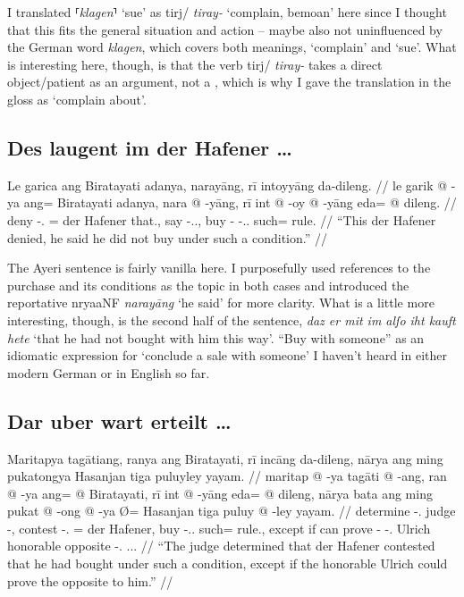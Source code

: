 \documentclass[12pt,paper=a4]{scrartcl}
\newcommand{\fw}[1]{\textit{#1}} %
\newcommand{\norm}[1]{⸢\textit{#1}⸣} %
\newcommand{\ayr}[1]{{\Tagati #1}}
\newcommand{\xayr}[3]{{\Tagati #1} \emph{#2} \enquote*{#3}}
\begin{document}
I translated \norm{klagen} `sue' as \xayr{tirj/}{tiray-}{complain, bemoan} here 
since I thought that this fits the general situation and action -- maybe also 
not uninfluenced by the German word \Nhg{} \fw{klagen}, which covers both 
meanings, `complain' and `sue'. What is interesting here, though, is that the 
verb \ayr{tirj/} \fw{tiray-} takes a direct object/patient \Np{} as an argument, 
not a \Pp{}, which is why I gave the translation in the gloss as `complain 
about'.

\subsection*{Des laugent im der Hafener …}


\ex
\begingl
	\glpreamble Le garica ang Biratayati adanya, narayāng, rī intoyyāng 
		da-dileng. //
	\gla le garik @ -ya ang= Biratayati adanya, nara @ -yāng, rī int @ 
		-oy @ -yāng eda= @ dileng. //
	\glb \PatT{} deny -\Tsg{}.\M{} \Aarg{}= {der Hafener} that.\Top{}, say 
		-\Tsg{}.\M{}.\Aarg{}, \InsT{} buy -\Neg{} -\Tsg{}.\M{}.\Aarg{} 
		such= rule.\Top{} //
	\glft \enquote{This der Hafener denied, he said he did not buy under 
		such a condition.} //
\endgl \xe

The Ayeri sentence is fairly vanilla here. I purposefully used references to 
the purchase and its conditions as the topic in both cases and introduced the 
reportative \xayr{nryaaNF}{narayāng}{he said} for more clarity. What is a little 
more interesting, though, is the second half of the \Mhg{} sentence,
\fw{daz er mit im alſo iht kauft hete} `that he had not bought with him this 
way'. \enquote{Buy with someone} as an idiomatic expression for `conclude a sale 
with someone' I haven't heard in either modern German or in English so far.

\subsection*{Dar uber wart erteilt …}


\ex \begingl
	\glpreamble Maritapya tagātiang, ranya ang Biratayati, rī incāng
		da-dileng, nārya ang ming pukatongya Hasanjan tiga puluyley 
		yayam. //
	\gla maritap @ -ya tagāti @ -ang, ran @ -ya ang= @ Biratayati, rī
		int @ -yāng eda= @ dileng, nārya bata ang ming pukat @ -ong @ 
		-ya Ø= Hasanjan tiga puluy @ -ley yayam. //
	\glb determine -\Tsg{}.\M{} judge -\Aarg{}, contest -\Tsg{}.\M{}
		\Aarg{}= {der Hafener}, \InsT{} buy -\Tsg{}.\M{}.\Aarg{} such= 
		rule.\Top{}, except if \AgtT{} can prove -\Irr{} -\Tsg{}.\M{} 
		\Top{} Ulrich honorable opposite -\Parg{}.\Inan{} 
		\Tsg{}.\M{}.\Dat{}. //
	\glft \enquote{The judge determined that der Hafener contested that 
		he had bought under such a condition, except if the honorable 
		Ulrich could prove the opposite to him.} //
\endgl \xe
\end{document}
